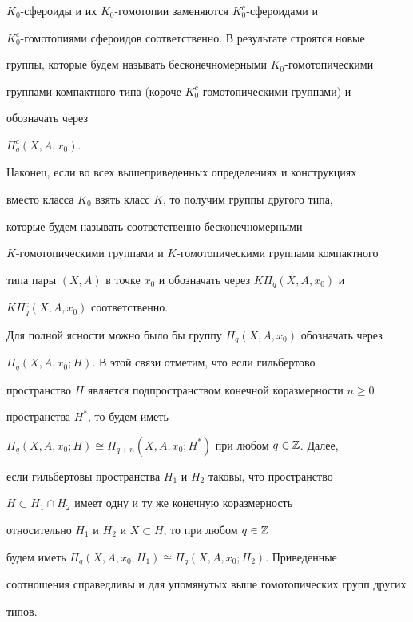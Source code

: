 $K_0$-сфероиды и их $K_0$-гомотопии заменяются $K^c_0$-сфероидами и 


$K^c_0$-гомотопиями сфероидов соответственно. В результате строятся новые 


группы, которые будем называть бесконечномерными $K_0$-гомотопическими 


группами компактного типа (короче $K^c_0$-гомотопическими группами) и 


обозначать через\linebreak 


$\Pi^{c}_q(X,A,x_0)$. 


 


Наконец, если во всех вышеприведенных определениях и конструкциях 


вместо класса $K_0$ взять класс $K$, то получим группы другого типа, 


которые будем называть соответственно бесконечномерными 


$K$-гомотопическими группами и $K$-гомотопическими группами компактного 


типа пары $(X,A)$ в точке $x_0$ и обозначать через $K\Pi_q(X,A,x_0)$ и 


$K\Pi^c_q(X,A,x_0)$ соответственно. 


 


\begin{note} 


Для полной ясности можно было бы группу $\Pi_q(X,A,x_0)$ обозначать через 


$\Pi_q(X,A,x_0;H)$. В этой связи отметим, что если гильбертово 


пространство $H$ является подпространством конечной коразмерности $n\ge0$ 


пространства $H^*$, то будем иметь 


$\Pi_q(X,A,x_0;H)\cong\Pi_{q+n}(X,A,x_0;H^*)$ при любом $q\in\Bbb Z$. Далее, 


если гильбертовы пространства $H_1$ и $H_2$ таковы, что пространство 


$H\subset H_1\cap H_2$ имеет одну и ту же конечную коразмерность 


относительно $H_1$ и $H_2$ и $X\subset H$, то при любом $q\in\Bbb Z$ 


будем иметь $\Pi_q(X,A,x_0;H_1)\cong\Pi_q(X,A,x_0;H_2)$. Приведенные 


соотношения справедливы и для упомянутых выше гомотопических групп других 


типов. 


\end{note} 



